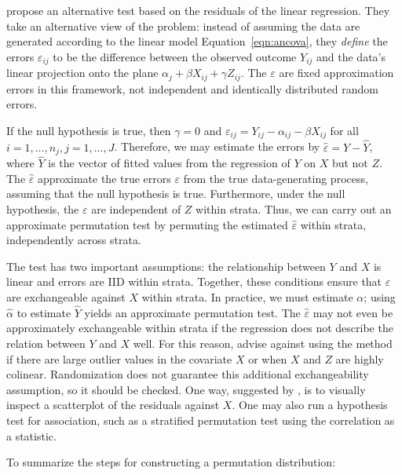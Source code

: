 \documentclass[12pt]{article}
\newcommand{\todo}[1]{{\color{red}{TO DO: \sc #1}}}
\begin{document}
\citet{freedman_nonstochastic_1983} propose an alternative test based on the residuals of the linear regression.
They take an alternative view of the problem:
instead of assuming the data are generated according to the linear model Equation~\ref{eqn:ancova}, they \textit{define} the errors $\varepsilon_{ij}$ to be the difference between the observed outcome $Y_{ij}$ and the data's linear projection onto the plane $\alpha_j + \beta X_{ij}+ \gamma Z_{ij}$.
The $\varepsilon$ are fixed approximation errors in this framework, not independent and identically distributed random errors.

If the null hypothesis is true, then $\gamma = 0$ and $\varepsilon_{ij} = Y_{ij} - \alpha_{ij} - \beta X_{ij}$ for all $i = 1, \dots, n_j, j = 1, \dots, J$.
Therefore, we may estimate the errors by $\hat{\varepsilon} =Y - \hat{Y}$, where $\hat{Y}$ is the vector of fitted values from the regression of $Y$ on $X$ but not $Z$.
The $\hat{\varepsilon}$ approximate the true errors $\varepsilon$ from the true data-generating process, assuming that the null hypothesis is true.
Furthermore, under the null hypothesis, the $\varepsilon$ are independent of $Z$ within strata. 
Thus, we can carry out an approximate permutation test by permuting the estimated $\hat{\varepsilon}$ within strata, independently across strata.

The test has two important assumptions:
the relationship between $Y$ and $X$ is linear and errors are IID within strata.
Together, these conditions ensure that $\varepsilon$ are exchangeable against $X$ within strata.
In practice, we must estimate $\alpha$; using $\hat{\alpha}$ to estimate $\hat{Y}$ yields an approximate permutation test.
The $\hat{\varepsilon}$ may not even be approximately exchangeable within strata if the regression does not describe the relation between $Y$ and $X$ well.
For this reason, \cite{freedman_nonstochastic_1983} advise against using the method if there are large outlier values in the covariate $X$ or when $X$ and $Z$ are highly colinear.
Randomization does not guarantee this additional exchangeability assumption, so it should be checked.
One way, suggested by \cite{freedman_nonstochastic_1983}, is to visually inspect a scatterplot of the residuals against $X$.
One may also run a hypothesis test for association, such as a stratified permutation test using the correlation as a statistic.
\todo{Do this test in the empirical section}


To summarize the steps for constructing a permutation distribution:
\end{document}
